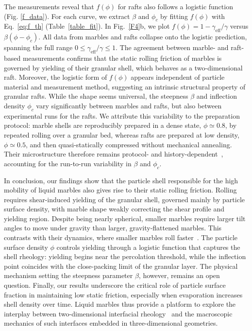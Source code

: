 \documentclass[twocolumn, prl,
 amsmath,amssymb,
 superscriptaddress,aps,
]{revtex4-2}
\begin{document}
The measurements reveal that $f(\phi)$ for rafts also follows a logistic function (Fig. \ref{f_data}). For each curve, we extract $\beta$ and $\phi_c$ by fitting $f(\phi)$ with Eq.~\ref{eq:f_th} (Table~\ref{table_fit}).
In Fig.~\ref{F4}b, we plot $f(\phi)=1-\gamma_\mathrm{eff}/\gamma$ versus $\beta(\phi-\phi_c)$. All data from marbles and rafts collapse onto the logistic prediction, spanning the full range $0\leq\gamma_\mathrm{eff}/\gamma\leq1$. The agreement between marble- and raft-based measurements confirms that the static rolling friction of marbles is governed by yielding of their granular shell, which behaves as a two-dimensional raft. Moreover, the logistic form of $f(\phi)$ appears independent of particle material and measurement method, suggesting an intrinsic structural property of granular rafts. While the shape seems universal, the steepness $\beta$ and inflection density $\phi_c$ vary significantly between marbles and rafts, but also between experimental runs for the rafts. 
We attribute this variability to the preparation protocol: marble shells are reproducibly prepared in a dense state, $\phi\simeq0.8$, by repeated rolling over a granular bed, whereas rafts are prepared at low density, $\phi\simeq0.5$, and then quasi-statically compressed without mechanical annealing. Their microstructure therefore remains protocol- and history-dependent~\cite{planchette2025unjamming}, accounting for the run-to-run variability in $\beta$ and $\phi_c$.

In conclusion, our findings show that the particle shell responsible for the high mobility of liquid marbles also gives rise to their static rolling friction. Rolling requires shear-induced yielding of the granular shell, governed mainly by particle surface density, with marble shape weakly correcting the shear profile and yielding region.
Despite being nearly spherical, smaller marbles require larger tilt angles to move under gravity than larger, gravity-flattened marbles. This contrasts with their dynamics, where smaller marbles roll faster~\cite{mahadevan1999rolling,aussillous2001liquid}. The particle surface density $\phi$ controls yielding through a logistic function that captures the shell rheology: yielding begins near the percolation threshold, while the inflection point coincides with the close-packing limit of the granular layer. The physical mechanism setting the steepness parameter $\beta$, however, remains an open question.
Finally, our results underscore the critical role of particle surface fraction in maintaining low static friction, especially when evaporation increases shell density over time. Liquid marbles thus provide a platform to explore the interplay between two-dimensional interfacial rheology~\cite{fuller2012complex,ji2020interfacial} and the macroscopic mechanics of such interfaces embedded in three-dimensional geometries.
\\
\end{document}
